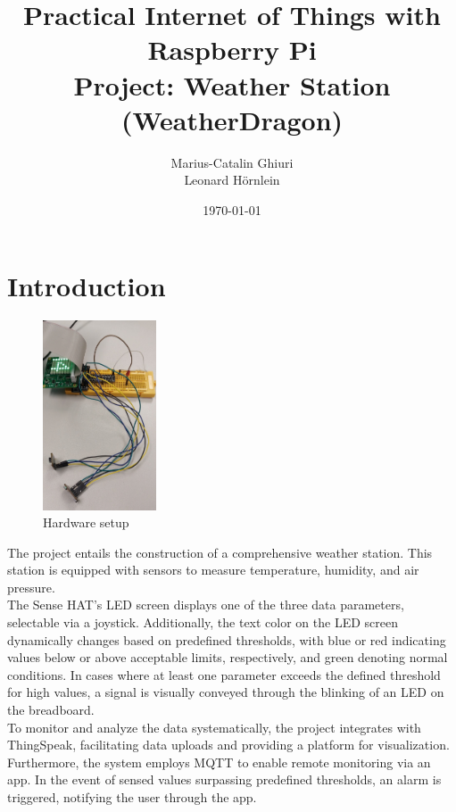 \documentclass[titlepage]{article}
\title{Practical Internet of Things with Raspberry Pi\\ Project: Weather Station (WeatherDragon)}
\author{Marius-Catalin Ghiuri\\Leonard Hörnlein}
\date{\today}
\begin{document}
\maketitle
\newpage
\tableofcontents


\newpage
\section{Introduction}
\begin{figure}
    \centering
    \includegraphics[width=0.3\textwidth]{img/dragon.jpg}
    \caption{Hardware setup}
    \label{fig:dragon}
\end{figure}

The project entails the construction of a comprehensive weather station. 
This station is equipped with sensors to measure temperature, humidity, and air pressure.\\
The Sense HAT's LED screen displays one of the three data parameters, selectable via a joystick.
Additionally, the text color on the LED screen dynamically changes based on predefined thresholds, with blue or red indicating values below or above acceptable limits, respectively, and green denoting normal conditions. 
In cases where at least one parameter exceeds the defined threshold for high values, a signal is visually conveyed through the blinking of an LED on the breadboard.\\
To monitor and analyze the data systematically, the project integrates with ThingSpeak, facilitating data uploads and providing a platform for visualization.\\
Furthermore, the system employs MQTT to enable remote monitoring via an app. 
In the event of sensed values surpassing predefined thresholds, an alarm is triggered, notifying the user through the app.


\newpage
\end{document}
